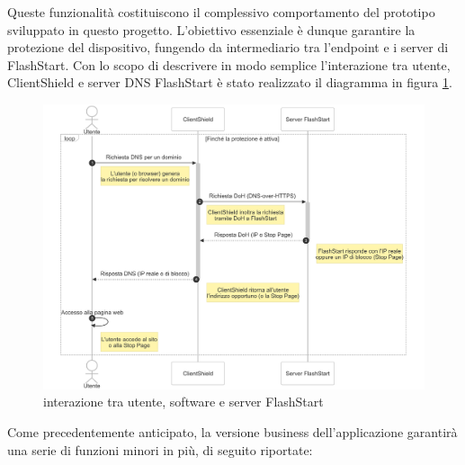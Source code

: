 \documentclass[12pt,a4paper,openright,twoside]{book}
\begin{document}
Queste funzionalità costituiscono il complessivo comportamento del prototipo sviluppato in questo progetto.
L'obiettivo essenziale è dunque garantire la protezione del dispositivo, fungendo da intermediario tra l'endpoint e i server di FlashStart.
Con lo scopo di descrivere in modo semplice l'interazione tra utente, ClientShield e server \gls{DNS} FlashStart è stato realizzato il diagramma in figura \ref{fig:interazione-utente-software-server}.

\begin{figure}[H]
	\centering
	\includegraphics[width=1.0\textwidth]{figures/schema-utente-software-server.png}
	\caption{interazione tra utente, software e server FlashStart}
	\label{fig:interazione-utente-software-server}
\end{figure}

Come precedentemente anticipato, la versione business dell'applicazione garantirà una serie di funzioni minori in più, di seguito riportate:
\end{document}
